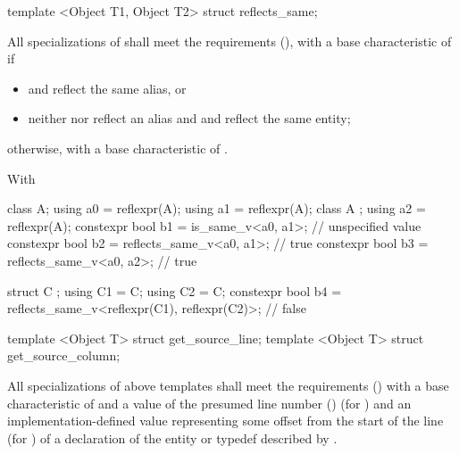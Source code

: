 \begin{std.txt}\color{addclr}

\begin{itemdecl}
template <Object T1, Object T2> struct reflects_same;
\end{itemdecl}

\begin{itemdescr}
\pnum
All specializations of  shall meet the  requirements (),
    with a base characteristic of  if 
\begin{itemize}
  \item {} and  reflect the same alias, or
  \item neither  nor  reflect an alias and  and  reflect the same entity;
\end{itemize}
    otherwise, with a base characteristic of .

\pnum
\begin{example}
With
\begin{codeblock}
class A;
using a0 = reflexpr(A);
using a1 = reflexpr(A);
class A {};
using a2 = reflexpr(A);
constexpr bool b1 = is_same_v<a0, a1>; // unspecified value
constexpr bool b2 = reflects_same_v<a0, a1>; // true
constexpr bool b3 = reflects_same_v<a0, a2>; // true

struct C { };
using C1 = C;
using C2 = C;
constexpr bool b4 = reflects_same_v<reflexpr(C1), reflexpr(C2)>; // false
\end{codeblock}
\end{example}

\end{itemdescr}


\begin{itemdecl}
template <Object T> struct get_source_line;
template <Object T> struct get_source_column;
\end{itemdecl}

\begin{itemdescr}
\pnum
All specializations of above templates shall meet the  requirements () with a base characteristic of  and a value of the presumed line number () (for ) and an implementation-defined value representing some offset from the start of the line (for ) of a declaration of the entity or typedef described by .
\end{itemdescr}


\end{std.txt}
